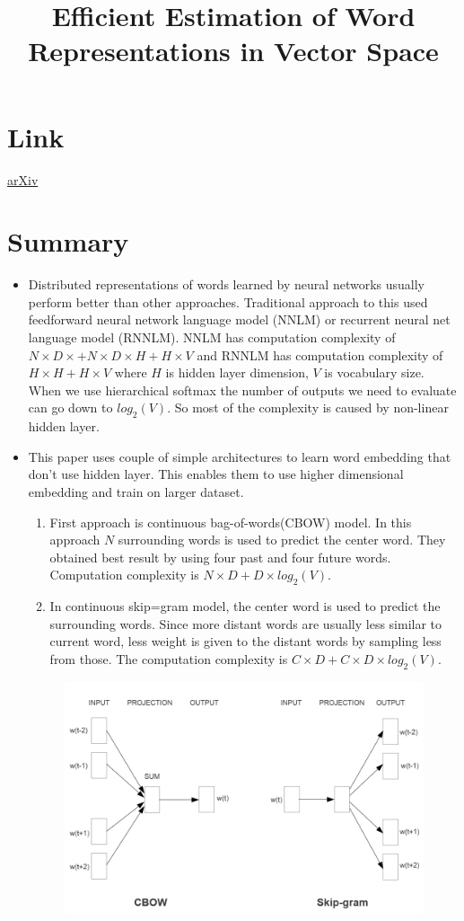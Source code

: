 \documentclass{article}
\title{Efficient Estimation of Word Representations in Vector Space}
\author{}
\date{}
\begin{document}
\maketitle

\section*{Link}
\href{https://arxiv.org/abs/1301.3781}{arXiv} 

\section*{Summary}
\begin{itemize}
    \item Distributed representations of words learned by neural networks usually perform better than other approaches. Traditional approach to this used feedforward neural network language model (NNLM) or recurrent neural net language model (RNNLM). NNLM has computation complexity of $N\times D \times + N \times D \times H + H \times V$ and RNNLM has computation complexity of $H \times H + H \times V$ where $H$ is hidden layer dimension, $V$ is vocabulary size. When we use hierarchical softmax the number of outputs we need to evaluate can go down to $log_2(V)$. So most of the complexity is caused by non-linear hidden layer. 
    \item This paper uses couple of simple architectures to learn word embedding that don't use hidden layer. This enables them to use higher dimensional embedding and train on larger dataset.
    \begin{enumerate}
        \item First approach is continuous bag-of-words(CBOW) model. In this approach $N$ surrounding words is used to predict the center word. They obtained best result by using four past and four future words. Computation complexity is $N \times D + D \times log_2(V)$.
        \item In continuous skip=gram model, the center word is used to predict the surrounding words. Since more distant words are usually less similar to current word, less weight is given to the distant words by sampling less from those. The computation complexity is $C\times D + C \times D \times log_2(V)$.
    \end{enumerate}
    \begin{figure}[H]
        \centering
        \includegraphics[scale=0.5]{architectures.png}

\end{figure}
\end{itemize}
\end{document}
